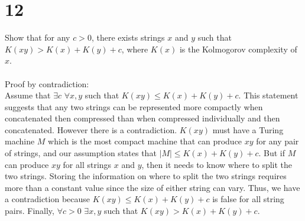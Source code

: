\documentclass[letterpaper,notitlepage,twoside]{article}
\begin{document}
\section*{12}
Show that for any $c > 0$, there exists strings $x$ and $y$ such that $K(xy) > K(x) + K(y) + c$, where $K(x)$ is the Kolmogorov complexity of $x$.\\\\
Proof by contradiction:\\
Assume that $\exists c$ $\forall x,y$ such that $K(xy) \leq K(x) + K(y) + c$. This statement suggests that any two strings can be represented more compactly when concatenated then compressed than when compressed individually and then concatenated. However there is a contradiction.  $K(xy)$ must have a Turing machine $M$ which is the most compact machine that can produce $xy$ for any pair of strings, and our assumption states that $|M| \leq K(x) + K(y) + c$. But if $M$ can produce $xy$ for all strings $x$ and $y$, then it needs to know where to split the two strings. Storing the information on where to split the two strings requires more than a constant value since the size of either string can vary. Thus, we have a contradiction because $K(xy) \leq K(x) + K(y) + c$ is false for all string pairs. Finally, $\forall c > 0$ $\exists x,y$ such that $K(xy) > K(x) + K(y) + c$.
\end{document}
